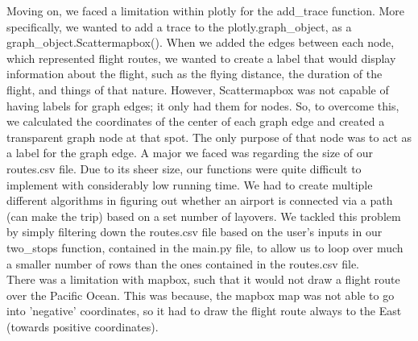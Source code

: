 \documentclass[fontsize=11pt]{article}
\begin{document}
Moving on, we faced a limitation within plotly for the add\_trace function. More specifically, we wanted to add a trace to the plotly.graph\_object, as a graph\_object.Scattermapbox(). When we added the edges between each node, which represented flight routes, we wanted to create a label that would display information about the flight, such as the flying distance, the duration of the flight, and things of that nature. However, Scattermapbox was not capable of having labels for graph edges; it only had them for nodes. So, to overcome this, we calculated the coordinates of the center of each graph edge and created a transparent graph node at that spot. The only purpose of that node was to act as a label for the graph edge. A major we faced was regarding the size of our routes.csv file. Due to its sheer size, our functions were quite difficult to implement with considerably low running time. We had to create multiple different algorithms in figuring out whether an airport is connected via a path (can make the trip) based on a set number of layovers. We tackled this problem by simply filtering down the routes.csv file based on the user’s inputs in our two\_stops function, contained in the main.py file, to allow us to loop over much a smaller number of rows than the ones contained in the routes.csv file. \\

There was a limitation with mapbox, such that it would not draw a flight route over the Pacific Ocean. This was because, the mapbox map was not able to go into 'negative' coordinates, so it had to draw the flight route always to the East (towards positive coordinates). \\
\end{document}
